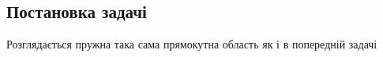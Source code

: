 

\subsection{Постановка задачі}
Розглядається пружна така сама прямокутна область як і в попередній задачі